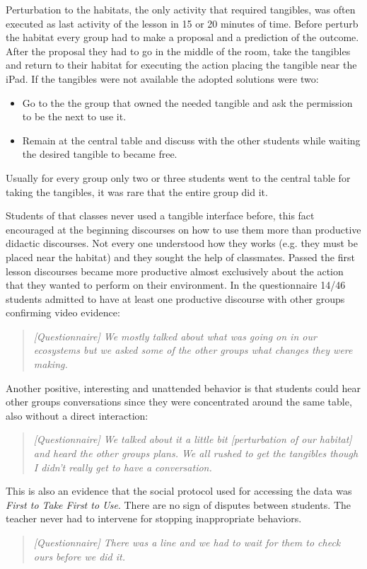 Perturbation to the habitats, the only activity that required tangibles, was often executed as last activity of the lesson in 15 or 20 minutes of time. Before perturb the habitat every group had to make a proposal and a prediction of the outcome. After the proposal they had to go in the middle of the room, take the tangibles and return to their habitat for executing the action placing the tangible near the iPad. If the tangibles were not available the adopted solutions were two:
\begin{itemize}
\item Go to the the group that owned the needed tangible and ask the permission to be the next to use it.
\item Remain at the central table and discuss with the other students while waiting the desired tangible to became free.
\end{itemize}
Usually for every group only two or three students went to the central table for taking the tangibles, it was rare that the entire group did it.

Students of that classes never used a tangible interface before, this fact encouraged at the beginning discourses on how to use them more than productive didactic discourses. Not every one understood how they works (e.g. they must be placed near the habitat) and they sought the help of classmates. Passed the first lesson discourses became more productive almost exclusively about the action that they wanted to perform on their environment. In the questionnaire 14/46 students admitted to have at least one productive discourse with other groups confirming video evidence:
\begin{quote}
\textit{[Questionnaire]
We mostly talked about what was going on in our ecosystems but we asked some of the other groups what changes they were making.}
\end{quote}

Another positive, interesting and unattended behavior is that students could hear other groups conversations since they were concentrated around the same table, also without a direct interaction:
\begin{quote}
\textit{[Questionnaire]
We talked about it a little bit [perturbation of our habitat] and heard the other groups plans. We all rushed to get the tangibles though I didn't really get to have a conversation.}
\end{quote}
This is also an evidence that the social protocol used for accessing the data was \textit{First to Take First to Use}. There are no sign of disputes between students. The teacher never had to intervene for stopping inappropriate behaviors.
\begin{quote}
\textit{[Questionnaire]
There was a line and we had to wait for them to check ours before we did it.}
\end{quote}

